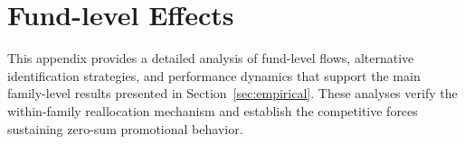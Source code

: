 \documentclass[12pt]{article}
\begin{document}
\clearpage





\section{Fund-level Effects}\label{sec:additional_results}

This appendix provides a detailed analysis of fund-level flows, alternative identification strategies, and performance dynamics that support the main family-level results presented in Section~\ref{sec:empirical}. These analyses verify the within-family reallocation mechanism and establish the competitive forces sustaining zero-sum promotional behavior.



\end{document}
